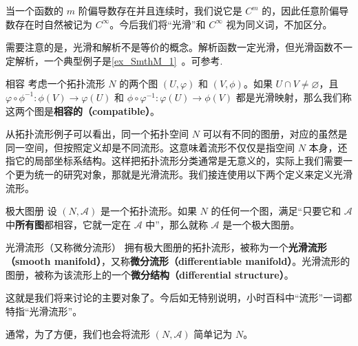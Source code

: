 当一个函数的 $m$ 阶偏导数存在并且连续时，我们说它是 $C^m$ 的，因此任意阶偏导数存在时自然被记为 $C^\infty$。今后我们将“光滑”和 $C^\infty$ 视为同义词，不加区分。

需要注意的是，光滑和解析不是等价的概念。解析函数一定光滑，但光滑函数不一定解析，一个典型例子是\autoref{ex_SmthM_1}~。可参考.

\begin{definition}{相容}
考虑一个拓扑流形 $N$ 的两个图 $(U, \varphi)$ 和 $(V, \phi)$。如果 $U\cap V\not=\varnothing$，且 $\varphi\circ\phi^{-1}:\phi(V)\rightarrow\varphi(U)$ 和 $\phi\circ\varphi^{-1}:\varphi(U)\rightarrow\phi(V)$ 都是光滑映射，那么我们称这两个图是\textbf{相容的（compatible）}。
\end{definition}

从拓扑流形例子可以看出，同一个拓扑空间 $N$ 可以有不同的图册，对应的虽然是同一空间，但按照定义却是不同流形。这意味着流形不仅仅是指空间 $N$ 本身，还指它的局部坐标系结构。这样把拓扑流形分类通常是无意义的，实际上我们需要一个更为统一的研究对象，那就是光滑流形。我们接连使用以下两个定义来定义光滑流形。

\begin{definition}{极大图册}
设 $(N, \mathcal{A})$ 是一个拓扑流形。如果 $N$ 的任何一个图，满足“只要它和 $\mathcal{A}$ 中\textbf{所有图}都相容，它就一定在 $\mathcal{A}$ 中”，那么就称 $\mathcal{A}$ 是一个极大图册。
\end{definition}

\begin{definition}{光滑流形（又称微分流形）}\label{def_Manif_3}
拥有极大图册的拓扑流形，被称为一个\textbf{光滑流形（smooth manifold）}，又称\textbf{微分流形（differentiable manifold）}。光滑流形的图册，被称为该流形上的一个\textbf{微分结构（differential structure）}。
\end{definition}


这就是我们将来讨论的主要对象了。今后如无特别说明，小时百科中“流形”一词都特指“光滑流形”。

通常，为了方便，我们也会将流形 $(N, \mathcal{A})$ 简单记为 $N$。





